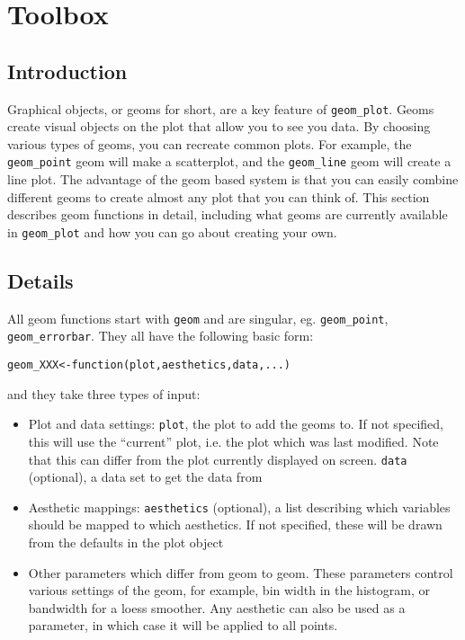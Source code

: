 

\chapter{Toolbox}

\section{Introduction}\label{sec:introduction}

Graphical objects, or geoms for short, are a key feature of {\tt geom\_plot}.  Geoms create visual objects on the plot that allow you to see you data.  By choosing various types of geoms, you can recreate common plots.  For example, the {\tt geom\_point} geom will make a scatterplot, and the {\tt geom\_line} geom will create a line plot.  The advantage of the geom based system is that you can easily combine different geoms to create almost any plot that you can think of.  This section describes geom functions in detail, including what geoms are currently available in {\tt geom\_plot} and how you can go about creating your own.


\section{Details}\label{sec:details}

All geom functions start with {\tt geom} and are singular, eg. {\tt geom\_point}, {\tt geom\_errorbar}.  They all have the following basic form:

\begin{alltt}
geom_XXX <- function(plot, aesthetics, data, ...) {}
\end{alltt}

\noindent and they take three types of input:

\begin{itemize}
	\item Plot and data settings: {\tt plot}, the plot to add the geoms to. If not specified, this will use the ``current'' plot, i.e. the plot which was last modified. Note that this can differ from the plot currently displayed on screen.  {\tt data} (optional), a data set to get the data from
	\item Aesthetic mappings: {\tt aesthetics} (optional), a list describing which variables should be mapped to which aesthetics.  If not specified, these will be drawn from the defaults in the plot object
	\item Other parameters which differ from geom to geom.  These parameters control various settings of the geom, for example, bin width in the histogram, or bandwidth for a loess smoother.  Any aesthetic can also be used as a parameter, in which case it will be applied to all points.
\end{itemize}

